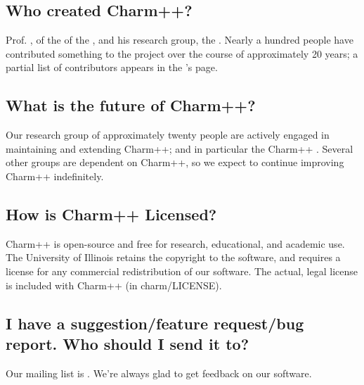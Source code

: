 \subsection{Who created Charm++?}

Prof. , of the
of the ,
and his research group, the .
Nearly a hundred people have contributed something
to the project over the course of approximately 20 years; a partial list
of contributors appears in the 's page.

\subsection{What is the future of Charm++?}

Our research group of approximately twenty people are actively engaged
in maintaining and extending Charm++; and in particular the Charm++ 
.
Several other groups are dependent on Charm++, so we expect to continue
improving Charm++ indefinitely.

\subsection{How is Charm++ Licensed?}

Charm++ is open-source and free for research, educational, and academic
use. The University of Illinois retains the copyright to the software,
and requires a license for any commercial redistribution of our software.
The actual, legal license is included with Charm++ (in charm/LICENSE).

\subsection{I have a suggestion/feature request/bug report. Who should I send
it to?}

Our mailing list is .
We're always glad to get feedback on our software.

